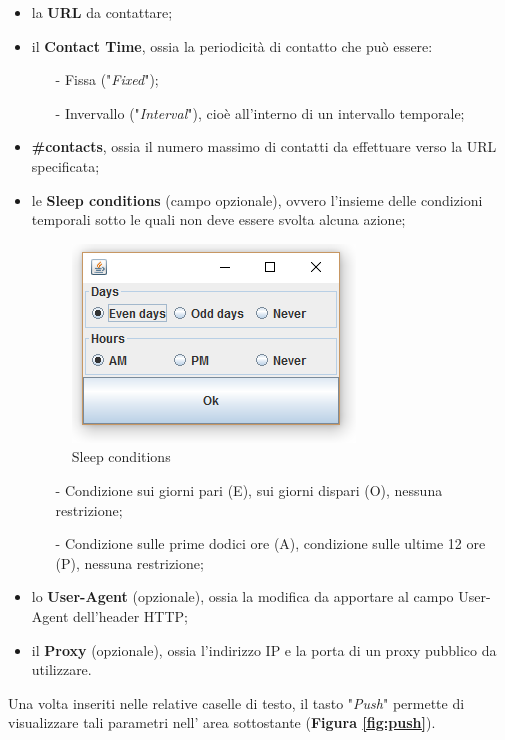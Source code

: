 \begin{itemize} 
\item la \textbf{URL} da contattare;
\item il \textbf{Contact Time}, ossia la periodicit\`{a} di contatto che pu\`{o} essere:
\begin{itemize}
\item [-] Fissa ("\textit{Fixed}");
\item [-] Invervallo ("\textit{Interval}"), cio\`e all'interno di un intervallo temporale;
\end{itemize} 
\item \textbf{\#contacts}, ossia il numero massimo di contatti da effettuare verso la URL specificata;
\item le \textbf{Sleep conditions} (campo opzionale), ovvero l'insieme delle condizioni temporali sotto le quali non deve essere svolta alcuna azione; 
\begin{figure}[!htb]
        \centering
		\includegraphics[width=0.4\linewidth]{./imgs/sleep}
        \caption{Sleep conditions}
\end{figure}
\begin{itemize}
\item [-] Condizione sui giorni pari (E), sui giorni dispari (O), nessuna restrizione;
\item [-] Condizione sulle prime dodici ore (A), condizione sulle ultime 12 ore (P), nessuna restrizione;
\end{itemize}
\item lo \textbf{User-Agent} (opzionale), ossia la modifica da apportare al campo User-Agent dell'header HTTP;
\item il \textbf{Proxy} (opzionale), ossia l'indirizzo IP e la porta di un proxy pubblico da utilizzare.
\end{itemize} 

Una volta inseriti nelle relative caselle di testo, il tasto "\textit{Push}" permette di visualizzare tali parametri nell' area sottostante (\textbf{Figura \ref{fig:push}}). 

